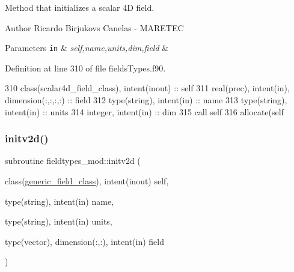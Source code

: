 Method that initializes a scalar 4D field. 

\begin{DoxyAuthor}{Author}
Ricardo Birjukovs Canelas -\/ M\+A\+R\+E\+T\+EC 
\end{DoxyAuthor}

\begin{DoxyParams}[1]{Parameters}
\mbox{\tt in}  & {\em self,name,units,dim,field} & \\
\hline
\end{DoxyParams}


Definition at line 310 of file fields\+Types.\+f90.


\begin{DoxyCode}
310     \textcolor{keywordtype}{class}(scalar4d\_field\_class), \textcolor{keywordtype}{intent(inout)} :: self
311     \textcolor{keywordtype}{real(prec)}, \textcolor{keywordtype}{intent(in)}, \textcolor{keywordtype}{dimension(:,:,:,:)} :: field
312     \textcolor{keywordtype}{type}(string), \textcolor{keywordtype}{intent(in)} :: name
313     \textcolor{keywordtype}{type}(string), \textcolor{keywordtype}{intent(in)} :: units
314     \textcolor{keywordtype}{integer}, \textcolor{keywordtype}{intent(in)} :: dim
315     \textcolor{keyword}{call }self%
316     \textcolor{keyword}{allocate}(self%
\end{DoxyCode}
\mbox{\label{namespacefieldtypes__mod_ad1af664e23793260f9c2fcd03829a1f5}} 
\subsubsection{\texorpdfstring{initv2d()}{initv2d()}}
{\footnotesize\ttfamily subroutine fieldtypes\+\_\+mod\+::initv2d (\begin{DoxyParamCaption}\item[{class(\mbox{\hyperlink{structfieldtypes__mod_1_1generic__field__class}{generic\+\_\+field\+\_\+class}}), intent(inout)}]{self,  }\item[{type(string), intent(in)}]{name,  }\item[{type(string), intent(in)}]{units,  }\item[{type(vector), dimension(\+:,\+:), intent(in)}]{field }\end{DoxyParamCaption})\hspace{0.3cm}{\ttfamily [private]}}



